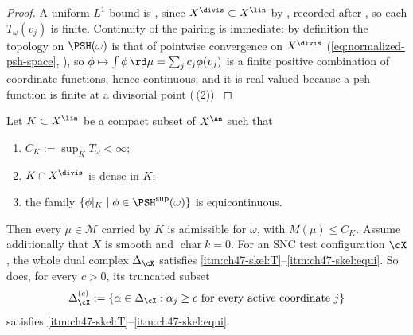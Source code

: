 \begin{proof}
A uniform $L^1$ bound is , since
$X^{\divis}\subset X^{\lin}$ by
\cite[Proposition~1.28]{BJ22}, recorded after
, so each $T_\omega(v_j)$ is finite.
Continuity of the pairing is immediate: by definition the topology on
$\PSH(\omega)$ is that of pointwise convergence on $X^{\divis}$
(\eqref{eq:normalized-psh-space}, ), so
$\phi\mapsto\int\phi\,\rd\mu=\sum_jc_j\phi(v_j)$ is a finite positive
combination of coordinate functions, hence continuous; and it is real
valued because a psh function is finite at a divisorial point
(\,(2)).
\end{proof}

\begin{proposition}
\label{prop:ch47-skeletal-admissible}
Let $K\subset X^{\lin}$ be a compact subset of $X^{\An}$ such that
\begin{enumerate}
\item\label{itm:ch47-skel:T}
      $C_K:=\sup_KT_\omega<\infty$;
\item\label{itm:ch47-skel:dense}
      $K\cap X^{\divis}$ is dense in $K$;
\item\label{itm:ch47-skel:equi}
      the family $\{\phi|_K\mid\phi\in\PSH^{\sup}(\omega)\}$ is
      equicontinuous.
\end{enumerate}
Then every $\mu\in\mathcal M$ carried by $K$ is admissible for
$\omega$, with $M(\mu)\le C_K$.
Assume additionally that $X$ is smooth and $\operatorname{char}k=0$.
For an SNC test configuration $\cX$, the whole dual complex
$\Delta_{\cX}$ satisfies
\cref{itm:ch47-skel:T}--\cref{itm:ch47-skel:equi}.
So does, for every $c>0$, its truncated subset
\[
 \Delta_{\cX}^{(c)}:=\{\alpha\in\Delta_{\cX}:
   \alpha_j\ge c\ \text{for every active coordinate }j\}
\]
satisfies \cref{itm:ch47-skel:T}--\cref{itm:ch47-skel:equi}.
\end{proposition}

